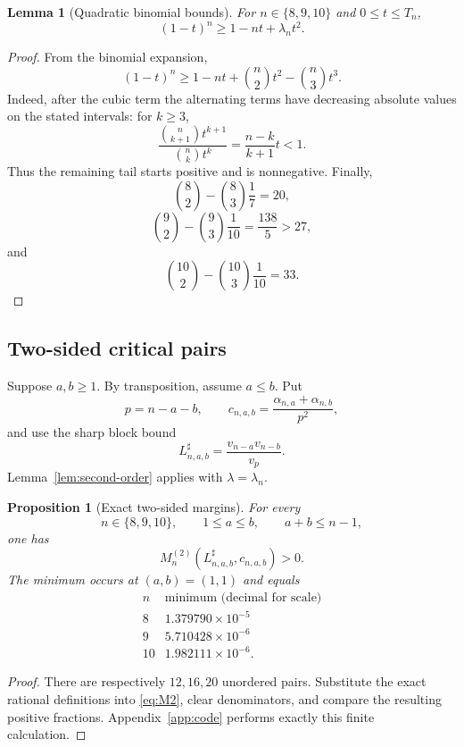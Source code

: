\documentclass[11pt,a4paper]{article}
\numberwithin{equation}{section}
\newtheorem{lemma}[theorem]{Lemma}
\newtheorem{proposition}[theorem]{Proposition}
\theoremstyle{definition}
\newcommand{\1}{\mathbf{1}}
\begin{document}
\begin{lemma}[Quadratic binomial bounds]\label{lem:binomial-low}
For $n\in\{8,9,10\}$ and $0\le t\le T_n$,
\begin{equation}\label{eq:low-binomial}
 (1-t)^n\ge1-nt+\lambda_nt^2.
\end{equation}
\end{lemma}

\begin{proof}
From the binomial expansion,
\[
 (1-t)^n
 \ge1-nt+\binom n2t^2-\binom n3t^3.
\]
Indeed, after the cubic term the alternating terms have decreasing absolute values on the stated intervals: for $k\ge3$,
\[
 \frac{\binom n{k+1}t^{k+1}}{\binom nk t^k}
 =\frac{n-k}{k+1}t<1.
\]
Thus the remaining tail starts positive and is nonnegative.  Finally,
\[
 \binom82-\binom83\frac17=20,
\]
\[
 \binom92-\binom93\frac1{10}=\frac{138}{5}>27,
\]
and
\[
 \binom{10}2-\binom{10}3\frac1{10}=33.
\]
\end{proof}

\subsection{Two-sided critical pairs}

Suppose $a,b\ge1$.  By transposition, assume $a\le b$.  Put
\[
 p=n-a-b,
 \qquad
 c_{n,a,b}=
 \frac{\alpha_{n,a}+\alpha_{n,b}}{p^2},
\]
and use the sharp block bound
\[
 L^{\sharp}_{n,a,b}=\frac{v_{n-a}v_{n-b}}{v_p}.
\]
Lemma~\ref{lem:second-order} applies with $\lambda=\lambda_n$.

\begin{proposition}[Exact two-sided margins]\label{prop:low-two-sided}
For every
\[
 n\in\{8,9,10\},
 \qquad
 1\le a\le b,
 \qquad
 a+b\le n-1,
\]
one has
\[
 M_n^{(2)}(L^{\sharp}_{n,a,b},c_{n,a,b})>0.
\]
The minimum occurs at $(a,b)=(1,1)$ and equals
\begin{equation}\label{eq:low-two-sided-table}
\begin{array}{c|c}
 n&\text{minimum (decimal for scale)}\\ \hline
 8&1.379790\times10^{-5}\\
 9&5.710428\times10^{-6}\\
 10&1.982111\times10^{-6}.
\end{array}
\end{equation}
\end{proposition}

\begin{proof}
There are respectively $12,16,20$ unordered pairs.  Substitute the exact rational definitions into \eqref{eq:M2}, clear denominators, and compare the resulting positive fractions.  Appendix~\ref{app:code} performs exactly this finite calculation.
\end{proof}
\end{document}
